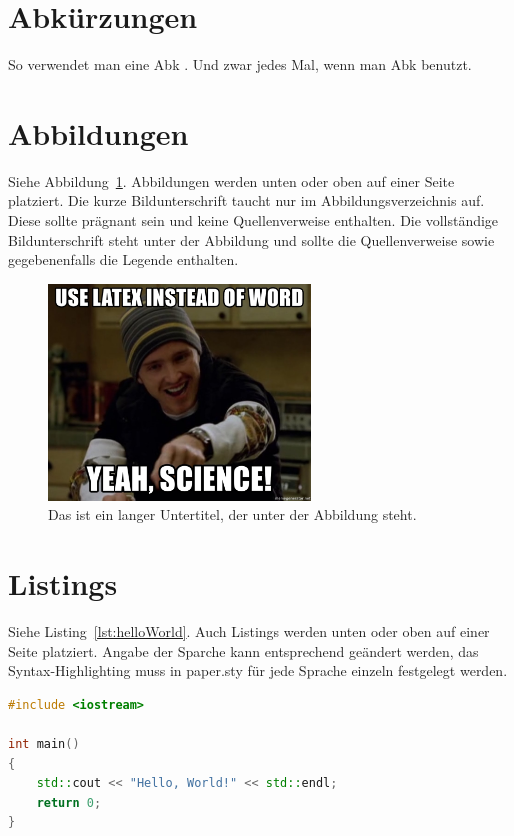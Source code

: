 \documentclass{iwi}
\begin{document}
\section{Abkürzungen} \label{sec:Abkürzungen}

So verwendet man eine \gls{Abk} . Und zwar jedes Mal, wenn man \gls{Abk} benutzt.

\section{Abbildungen} \label{sec:Abbildungen}

Siehe Abbildung~\ref{img:meme}. Abbildungen werden unten oder oben auf einer Seite platziert. 
Die kurze Bildunterschrift taucht nur im Abbildungsverzeichnis auf.
Diese sollte prägnant sein und keine Quellenverweise enthalten.
Die vollständige Bildunterschrift steht unter der Abbildung und sollte die Quellenverweise sowie gegebenenfalls die Legende enthalten.

\begin{figure}
    \centering
    \includegraphics[width = 0.62\textwidth]{img/science.jpg}
    \caption[Das ist ein kurzer Untertitel]{Das ist ein langer Untertitel, der unter der Abbildung steht.}
    \label{img:meme}
\end{figure}

\section{Listings} \label{sec:Listings}

Siehe Listing~\ref{lst:helloWorld}. Auch Listings werden unten oder oben auf einer Seite platziert. 
Angabe der Sparche kann entsprechend geändert werden, das Syntax-Highlighting muss in paper.sty für jede Sprache einzeln festgelegt werden.


\begin{lstlisting}[float, caption={Hello, World!}, label={lst:helloWorld}, language=C++] 
#include <iostream>

int main() 
{
    std::cout << "Hello, World!" << std::endl;
    return 0;
}
\end{lstlisting}
\end{document}
